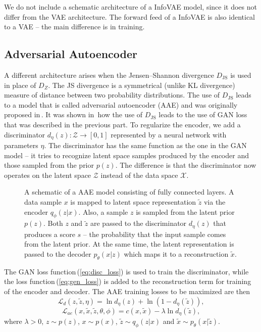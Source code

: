 We do not include a schematic architecture of a InfoVAE model, since
it does not differ from the VAE architecture. The forward feed of
a InfoVAE is also identical to a VAE -- the main difference is in
training.

\subsection{Adversarial Autoencoder}

A different architecture arises when the Jensen--Shannon divergence
$D_{\text{JS}}$ is used in place of $D_{Z}$. The JS divergence is
a symmetrical (unlike KL divergence) measure of distance between two
probability distributions. The use of $D_{\text{JS}}$ leads to a
model that is called adversarial autoencoder (AAE) and was originally
proposed in\,\cite{makhzani2015adversarial}. It was shown in\,\cite{tolstikhin2017wasserstein}
how the use of $D_{\text{JS}}$ leads to the use of GAN loss that
was described in the previous part. To regularize the encoder, we
add a discriminator $d_{\eta}(z):\mathcal{Z}\rightarrow\left[0,1\right]$
represented by a neural network with parameters $\eta$. The discriminator
has the same function as the one in the GAN model -- it tries to
recognize latent space samples produced by the encoder and those sampled
from the prior $p(z)$. The difference is that the discriminator now
operates on the latent space $\mathcal{Z}$ instead of the data space
$\mathcal{X}$. 

\begin{figure}
\centering{}\caption{A schematic of a AAE model consisting of fully connected layers. A
data sample $x$ is mapped to latent space representation $\tilde{z}$
via the encoder $q_{\phi}(z|x)$. Also, a sample $z$ is sampled from
the latent prior $p(z)$. Both $z$ and $\tilde{z}$ are passed to
the discriminator $d_{\eta}(z)$ that produces a score $s$ -- the
probability that the input sample comes from the latent prior. At
the same time, the latent representation is passed to the decoder
$p_{\theta}(x|z)$ which maps it to a reconstruction $\tilde{x}$.}
\label{fig:aae}
\end{figure}

The GAN loss function\,(\ref{eq:disc_loss}) is used to train the
discriminator, while the loss function\,(\ref{eq:gen_loss}) is added
to the reconstruction term for training of the encoder and decoder.
The AAE training losses to be maximized are then
\begin{equation}
\mathcal{L}_{d}(z,\tilde{z},\eta)=\ln d_{\eta}(z)+\ln(1-d_{\eta}(\tilde{z})),\label{eq:aae_loss_disc}
\end{equation}
\begin{equation}
\mathcal{L}_{ae}(x,\tilde{x},\tilde{z},\theta,\phi)=c(x,\tilde{x})-\lambda\ln d_{\eta}(\tilde{z}),\label{eq:aae_loss_autoencoder}
\end{equation}
where $\lambda>0$, $z\sim p(z)$, $x\sim p(x)$, $\tilde{z}\sim q_{\phi}(z|x)$
and $\tilde{x}\sim p_{\theta}(x|\tilde{z})$.

